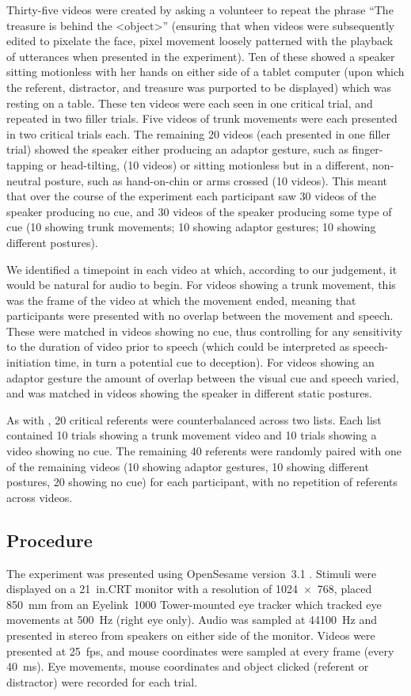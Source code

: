 \documentclass[a4paper,man,natbib]{apa6}
\newcommand*{\spex}[1]{``{#1}''} %
\let\oldtodo\todo
\renewcommand*{\todo}[1]{\oldtodo[fancyline]{#1}}
\begin{document}
Thirty-five videos were created by asking a volunteer to repeat the phrase \spex{The treasure is behind the <object>} (ensuring that when videos were subsequently edited to pixelate the face, pixel movement loosely patterned with the playback of utterances when presented in the experiment). \todo{JK: maybe instead just: Thirty-five videos were created.}
Ten of these showed a speaker sitting motionless with her hands on either side of a tablet computer (upon which the referent, distractor, and treasure was purported to be displayed) which was resting on a table.
These ten videos were each seen in one critical trial, and repeated in two filler trials.
Five videos of trunk movements were each presented in two critical trials each.
The remaining 20 videos (each presented in one filler trial) showed the speaker either producing an adaptor gesture, such as finger-tapping or head-tilting, (10 videos) or sitting motionless but in a different, non-neutral posture, such as hand-on-chin or arms crossed (10 videos).
This meant that over the course of the experiment each participant saw 30 videos of the speaker producing no cue, and 30 videos of the speaker producing some type of cue (10 showing trunk movements; 10 showing adaptor gestures; 10 showing different postures).

We identified a timepoint in each video at which, according to our judgement, it would be natural for audio to begin. 
For videos showing a trunk movement, this was the frame of the video at which the movement ended, meaning that participants were presented with no overlap between the movement and speech.
These were matched in videos showing no cue, thus controlling for any sensitivity to the duration of video prior to speech (which could be interpreted as speech-initiation time, in turn a potential cue to deception). 
For videos showing an adaptor gesture the amount of overlap between the visual cue and speech varied, and was matched in videos showing the speaker in different static postures.

As with \citet{Loy2017}, 20 critical referents were counterbalanced across two lists. 
Each list contained 10 trials showing a trunk movement video and 10 trials showing a video showing no cue.
The remaining 40 referents were randomly paired with one of the remaining videos (10 showing adaptor gestures, 10 showing different postures, 20 showing no cue) for each participant, with no repetition of referents across videos.

\subsection{Procedure}
The experiment was presented using OpenSesame version~3.1 \citep{Mathot2012}.
Stimuli were displayed on a 21~in.\@ CRT monitor with a resolution of 1024~$\times$~768, placed 850~mm from an Eyelink~1000 Tower-mounted eye tracker which tracked eye movements at 500~Hz (right eye only). 
Audio was sampled at 44100~Hz and presented in stereo from speakers on either side of the monitor. 
Videos were presented at 25~fps, and mouse coordinates were sampled at every frame (every 40~ms).
Eye movements, mouse coordinates and object clicked (referent or distractor) were recorded for each trial.
\end{document}

